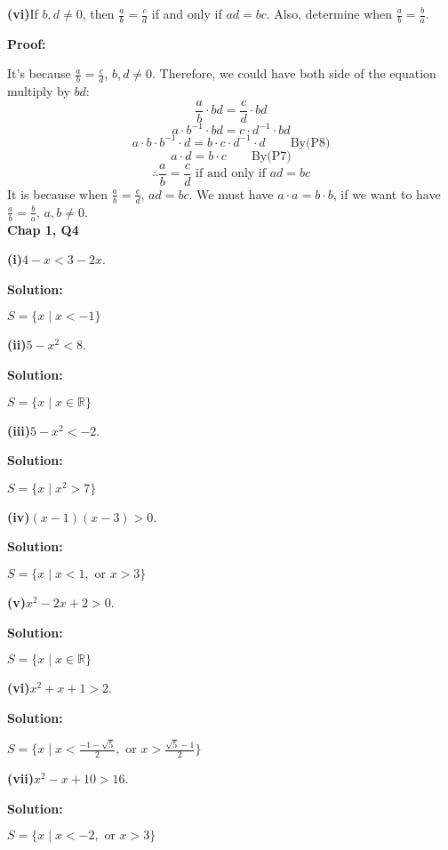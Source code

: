 \documentclass[a4paper,12pt]{report}
\begin{document}
\noindent
\textbf{(vi)}If $b,d \neq 0$, then $\frac{a}{b}=\frac{c}{d}$ if and only if $ad=bc$. Also, determine when $\frac{a}{b}=\frac{b}{a}$.

\noindent
\textbf{Proof:}

\noindent
It's because $\frac{a}{b}=\frac{c}{d}$, $b,d \neq 0$. Therefore, we could have both side of the equation multiply by $bd$:
\[\frac{a}{b}\cdot{bd}=\frac{c}{d}\cdot{bd}\]
\[a\cdot{b^{-1}}\cdot{bd}=c\cdot{d^{-1}}\cdot{bd}\]
\[a\cdot{b}\cdot{b^{-1}}\cdot{d}=b\cdot{c}\cdot{d^{-1}}\cdot{d} \qquad \text{By(P8)}\]
\[a\cdot{d}=b\cdot{c} \qquad \text{By(P7)}\]
\[\therefore \frac{a}{b}=\frac{c}{d} \text{ if and only if } ad=bc\]
It is because when $\frac{a}{b}=\frac{c}{d}$, $ad=bc$. We must have $a\cdot{a}=b\cdot{b}$, if we want to have $\frac{a}{b}=\frac{b}{a}$, $a,b\neq 0$.\\

\noindent
\textbf{Chap 1, Q4} 

\noindent
\textbf{(i)}$4-x<3-2x$.

\noindent
\textbf{Solution:}

\noindent
$S=\{x \mid x <-1\}$

\noindent
\textbf{(ii)}$5-x^2<8$.

\noindent
\textbf{Solution:}

\noindent
$S=\{x \mid x \in \mathbb{R}\}$

\noindent
\textbf{(iii)}$5-x^2<-2$.

\noindent
\textbf{Solution:}

\noindent
$S=\{x \mid x^2 >7\}$

\noindent
\textbf{(iv)}$(x-1)(x-3)>0$.

\noindent
\textbf{Solution:}

\noindent
$S=\{x \mid x<1, \text{ or } x>3\}$

\noindent
\textbf{(v)}$x^2-2x+2>0$.

\noindent
\textbf{Solution:}

\noindent
$S=\{x \mid x \in \mathbb{R}\}$

\noindent
\textbf{(vi)}$x^2+x+1>2$.

\noindent
\textbf{Solution:}

\noindent
$S=\{x \mid x<\frac{-1-\sqrt{5}}{2}, \text{ or } x>\frac{\sqrt{5}-1}{2}\}$

\noindent
\textbf{(vii)}$x^2-x+10>16$.

\noindent
\textbf{Solution:}

\noindent
$S=\{x \mid x<-2, \text{ or } x>3\}$
\end{document}

